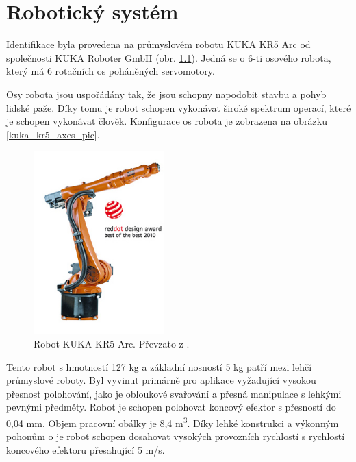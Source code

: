 
\chapter{Robotický systém}

Identifikace byla provedena na průmyslovém robotu KUKA KR5 Arc \cite{kuka_url} od společnosti KUKA Roboter GmbH (obr. \ref{kuka_kr5_pic}). Jedná se o 6-ti osového robota, který má 6 rotačních os poháněných servomotory. 

Osy robota jsou uspořádány tak, že jsou schopny napodobit stavbu a pohyb lidské paže. Díky tomu je robot schopen vykonávat široké spektrum operací, které je schopen vykonávat člověk. Konfigurace os robota je zobrazena na obrázku \ref{kuka_kr5_axes_pic}.  

\begin{figure}[ht]
\includegraphics[width=0.45\textwidth]{PR_KR5_arc_02}
\caption{Robot KUKA KR5 Arc. Převzato z \cite{kuka_datasheet_url}.}
\label{kuka_kr5_pic}
\end{figure}

Tento robot s hmotností 127 kg a základní nosností 5 kg patří mezi lehčí průmyslové roboty. Byl vyvinut primárně pro aplikace vyžadující vysokou přesnost polohování, jako je obloukové svařování a přesná manipulace s lehkými pevnými předměty. Robot je schopen polohovat koncový efektor s přesností do 0,04 mm. Objem pracovní obálky je 8,4 \si{m^{3}}. Díky lehké konstrukci a výkonným pohonům o je robot schopen dosahovat vysokých provozních rychlostí s rychlostí koncového efektoru přesahující 5 \si{m/s}.  


